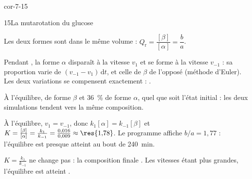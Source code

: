 \begin{blocLivre}{cor-7-15}
\begin{corrige}{15}{La mutarotation du glucose}
\begin{questions}
\item Les deux formes sont dans le même volume : $Q_\mathrm{r}=\dfrac{[\beta]}{[\alpha]}=\dfrac{b}{a}$.
\item Pendant , la forme $\alpha$ disparaît à la vitesse $v_1$ et se forme à la vitesse $v_{-1}$ : sa proportion
varie de $(v_{-1}-v_1)\,\mathrm{d}t$, et celle de $\beta$ de l'opposé (méthode d'Euler). Les deux variations se compensent
exactement : .
\item À l'équilibre,  de forme $\beta$ et 36~\% de forme $\alpha$, quel que soit l'état initial : les deux
simulations tendent vers la même composition.
\item À l'équilibre, $v_1=v_{-1}$, donc $k_1[\alpha]=k_{-1}[\beta]$ et $K=\frac{[\beta]}{[\alpha]}=\frac{k_1}{k_{-1}}=\frac{0{,}016}{0{,}009}\approx\res{1{,}78}$.
Le programme affiche $b/a=1{,}77$ : l'équilibre est presque atteint au bout de 240~min.
\item $K=\frac{k_1}{k_{-1}}$ ne change pas : la composition finale . Les vitesses étant plus grandes,
l'équilibre est atteint .
\end{questions}
\end{corrige}
\end{blocLivre}
